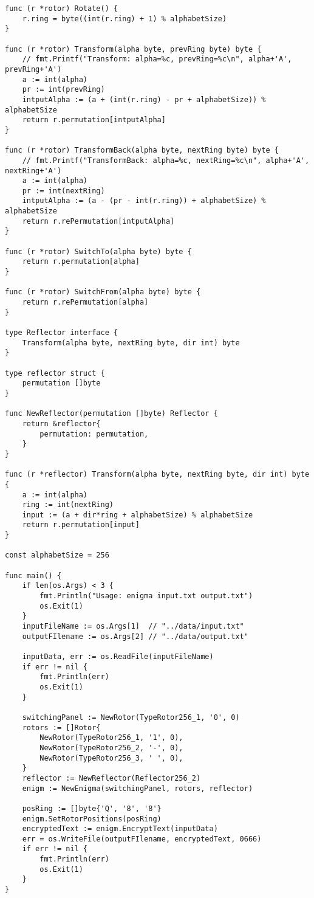 \begin{lstlisting}[style=golang, caption={Реализация электронного аналога шифровальной машины «Энигма»}, label=lst:codegolang]
func (r *rotor) Rotate() {
	r.ring = byte((int(r.ring) + 1) % alphabetSize)
}

func (r *rotor) Transform(alpha byte, prevRing byte) byte {
	// fmt.Printf("Transform: alpha=%c, prevRing=%c\n", alpha+'A', prevRing+'A')
	a := int(alpha)
	pr := int(prevRing)
	intputAlpha := (a + (int(r.ring) - pr + alphabetSize)) % alphabetSize
	return r.permutation[intputAlpha]
}

func (r *rotor) TransformBack(alpha byte, nextRing byte) byte {
	// fmt.Printf("TransformBack: alpha=%c, nextRing=%c\n", alpha+'A', nextRing+'A')
	a := int(alpha)
	pr := int(nextRing)
	intputAlpha := (a - (pr - int(r.ring)) + alphabetSize) % alphabetSize
	return r.rePermutation[intputAlpha]
}

func (r *rotor) SwitchTo(alpha byte) byte {
	return r.permutation[alpha]
}

func (r *rotor) SwitchFrom(alpha byte) byte {
	return r.rePermutation[alpha]
}

type Reflector interface {
	Transform(alpha byte, nextRing byte, dir int) byte
}

type reflector struct {
	permutation []byte
}

func NewReflector(permutation []byte) Reflector {
	return &reflector{
		permutation: permutation,
	}
}

func (r *reflector) Transform(alpha byte, nextRing byte, dir int) byte {
	a := int(alpha)
	ring := int(nextRing)
	input := (a + dir*ring + alphabetSize) % alphabetSize
	return r.permutation[input]
}

const alphabetSize = 256

func main() {
	if len(os.Args) < 3 {
		fmt.Println("Usage: enigma input.txt output.txt")
		os.Exit(1)
	}
	inputFileName := os.Args[1]  // "../data/input.txt"
	outputFIlename := os.Args[2] // "../data/output.txt"
	
	inputData, err := os.ReadFile(inputFileName)
	if err != nil {
		fmt.Println(err)
		os.Exit(1)
	}
	
	switchingPanel := NewRotor(TypeRotor256_1, '0', 0)
	rotors := []Rotor{
		NewRotor(TypeRotor256_1, '1', 0),
		NewRotor(TypeRotor256_2, '-', 0),
		NewRotor(TypeRotor256_3, ' ', 0),
	}
	reflector := NewReflector(Reflector256_2)
	enigm := NewEnigma(switchingPanel, rotors, reflector)
	
	posRing := []byte{'Q', '8', '8'}
	enigm.SetRotorPositions(posRing)
	encryptedText := enigm.EncryptText(inputData)
	err = os.WriteFile(outputFIlename, encryptedText, 0666)
	if err != nil {
		fmt.Println(err)
		os.Exit(1)
	}
}

\end{lstlisting}

